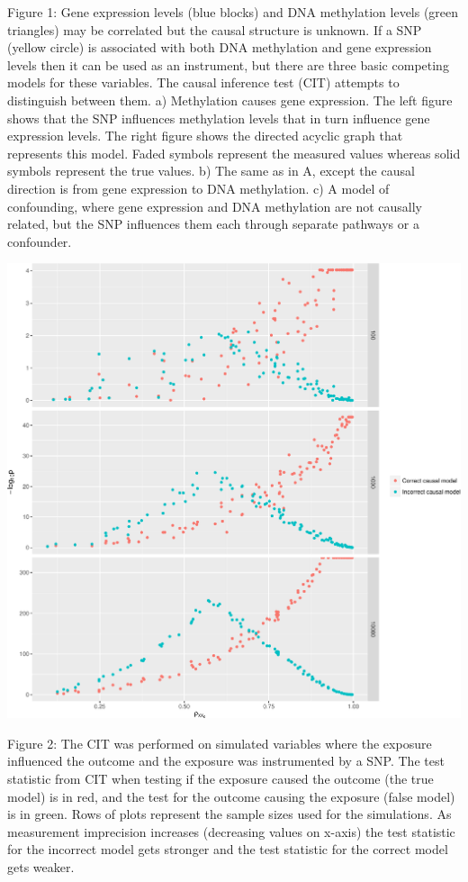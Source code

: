\documentclass[]{article}
\begin{document}
Figure 1: Gene expression levels (blue blocks) and DNA methylation
levels (green triangles) may be correlated but the causal structure is
unknown. If a SNP (yellow circle) is associated with both DNA
methylation and gene expression levels then it can be used as an
instrument, but there are three basic competing models for these
variables. The causal inference test (CIT) attempts to distinguish
between them. a) Methylation causes gene expression. The left figure
shows that the SNP influences methylation levels that in turn influence
gene expression levels. The right figure shows the directed acyclic
graph that represents this model. Faded symbols represent the measured
values whereas solid symbols represent the true values. b) The same as
in A, except the causal direction is from gene expression to DNA
methylation. c) A model of confounding, where gene expression and DNA
methylation are not causally related, but the SNP influences them each
through separate pathways or a confounder.

\newpage

\includegraphics{manuscript_files/figure-latex/cit_measurement_error_figure-1.pdf}

Figure 2: The CIT was performed on simulated variables where the
exposure influenced the outcome and the exposure was instrumented by a
SNP. The test statistic from CIT when testing if the exposure caused the
outcome (the true model) is in red, and the test for the outcome causing
the exposure (false model) is in green. Rows of plots represent the
sample sizes used for the simulations. As measurement imprecision
increases (decreasing values on x-axis) the test statistic for the
incorrect model gets stronger and the test statistic for the correct
model gets weaker.
\end{document}
